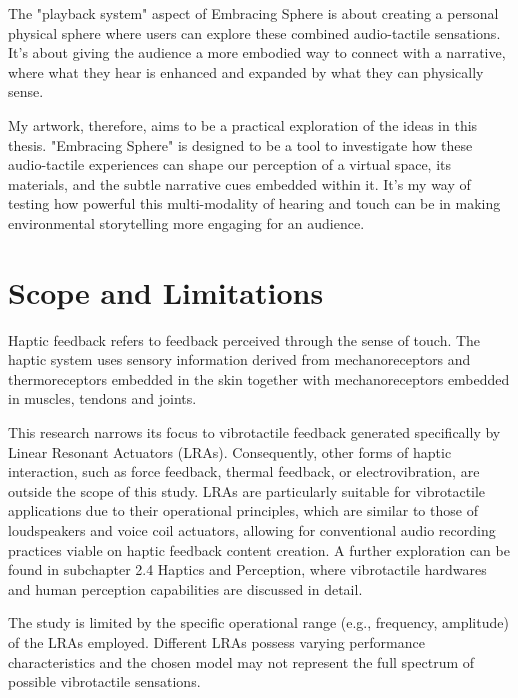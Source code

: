    The "playback system" aspect of Embracing Sphere is about creating a personal physical sphere where users can explore these combined audio-tactile sensations. It's about giving the audience a more embodied way to connect with a narrative, where what they hear is enhanced and expanded by what they can physically sense.\par
    
    My artwork, therefore, aims to be a practical exploration of the ideas in this thesis. "Embracing Sphere" is designed to be a tool to investigate how these audio-tactile experiences can shape our perception of a virtual space, its materials, and the subtle narrative cues embedded within it. It’s my way of testing how powerful this multi-modality of hearing and touch can be in making environmental storytelling more engaging for an audience.\par

    \section{Scope and Limitations}
    Haptic feedback refers to feedback perceived through the sense of touch. The haptic system uses sensory information derived from mechanoreceptors and thermoreceptors embedded in the skin together with mechanoreceptors embedded in muscles, tendons and joints\cite{Haptic_Perception-A_Tutorial}.\par 

    This research narrows its focus to vibrotactile feedback generated specifically by Linear Resonant Actuators (LRAs). Consequently, other forms of haptic interaction, such as force feedback, thermal feedback, or electrovibration, are outside the scope of this study. LRAs are particularly suitable for vibrotactile applications due to their operational principles, which are similar to those of loudspeakers and voice coil actuators\cite{Audio-Tactile_Rendering}, allowing for conventional audio recording practices viable on haptic feedback content creation. A further exploration can be found in subchapter 2.4 Haptics and Perception, where vibrotactile hardwares and human perception capabilities are discussed in detail.\par 

    The study is limited by the specific operational range (e.g., frequency, amplitude) of the LRAs employed. Different LRAs possess varying performance characteristics and the chosen model may not represent the full spectrum of possible vibrotactile sensations.\par

